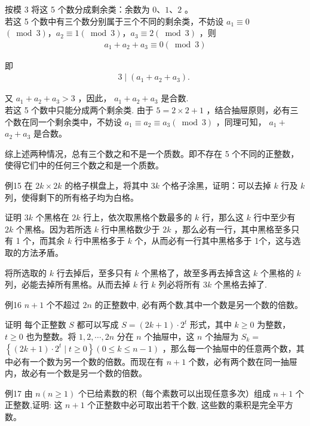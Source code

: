\documentclass[10pt]{article}
\begin{document}
按模 3 将这 5 个数分成剩余类：余数为 $0 、 1 、 2$ 。\\
若这 5 个数中有三个数分别属于三个不同的剩余类，不妨设 $a_{1} \equiv 0$ $(\bmod 3) ， a_{2} \equiv 1(\bmod 3) ， a_{3} \equiv 2(\bmod 3)$ ，则\\
\begin{align*}
a_{1}+a_{2}+a_{3} \equiv 0(\bmod 3)
\end{align*}

即\\
\begin{align*}
3 \mid\left(a_{1}+a_{2}+a_{3}\right) \text {. }
\end{align*}

又 $a_{1}+a_{2}+a_{3}>3$ ，因此， $a_{1}+a_{2}+a_{3}$ 是合数.\\
若这 5 个数中只能分成两个剩余类. 由于 $5=2 \times 2+1$ ，结合抽屉原则，必有三个数在同一个剩余类中，不妨设 $a_{1} \equiv a_{2} \equiv a_{3}(\bmod 3)$ ，同理可知， $a_{1}+$ $a_{2}+a_{3}$ 是合数。

综上述两种情况，总有三个数之和不是一个质数。即不存在 5 个不同的正整数，使得它们中的任何三个数之和是一个质数。

例15 在 $2 k \times 2 k$ 的格子棋盘上，将其中 $3 k$ 个格子涂黑，证明：可以去掉 $k$ 行及 $k$ 列，使得剩下的所有格子均为白格。

证明 $3 k$ 个黑格在 $2 k$ 行上，依次取黑格个数最多的 $k$ 行，那么这 $k$ 行中至少有 $2 k$ 个黑格。因为若所选 $k$ 行中黑格数少于 $2 k$ ，那么必有一行，其中黑格至多只有 1 个，而其余 $k$ 行中黑格多于 $k$ 个，从而必有一行其中黑格多于 1个，这与选取的方法矛盾。

将所选取的 $k$ 行去掉后，至多只有 $k$ 个黑格了，故至多再去掉含这 $k$ 个黑格的 $k$ 列，必能去掉所有黑格。从而去掉 $k$ 行 $k$ 列必将所有 $3 k$ 个黑格去掉了.

例16 $n+1$ 个不超过 $2 n$ 的正整数中, 必有两个数,其中一个数是另一个数的倍数。

证明 每个正整数 $S$ 都可以写成 $S=(2 k+1) \cdot 2^{t}$ 形式，其中 $k \geqslant 0$ 为整数， $t \geqslant 0$ 也为整数。将 $1,2, \cdots, 2 n$ 分在 $n$ 个抽屉中，这 $n$ 个抽屉为 $S_{k}=$ $\left\{(2 k+1) \cdot 2^{t} \mid t \geqslant 0\right\}(0 \leqslant k \leqslant n-1)$ ，那么每一个抽屉中的任意两个数，其中必有一个数为另一个数的倍数。而现在有 $n+1$ 个数，必有两个数在同一抽屉内，故必有一个数是另一个数的倍数。

例17 由 $n(n \geqslant 1)$ 个已给素数的积（每个素数可以出现任意多次）组成 $n+1$ 个正整数,证明: 这 $n+1$ 个正整数中必可取出若干个数, 这些数的乘积是完全平方数。
\end{document}
